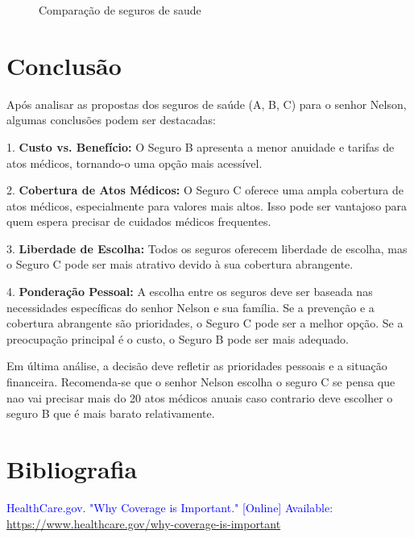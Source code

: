 \documentclass[10pt,a4paper]{article}
\begin{document}
\begin{figure}[!ht]
	\caption{Comparação de seguros de saude}
\end{figure}

\newpage
\section{Conclusão}

Após analisar as propostas dos seguros de saúde (A, B, C) para o senhor Nelson, algumas conclusões podem ser destacadas:

1. \textbf{Custo vs. Benefício:} O Seguro B apresenta a menor anuidade e tarifas de atos médicos, tornando-o uma opção mais acessível.

2. \textbf{Cobertura de Atos Médicos:} O Seguro C oferece uma ampla cobertura de atos médicos, especialmente para valores mais altos. Isso pode ser vantajoso para quem espera precisar de cuidados médicos frequentes.

3. \textbf{Liberdade de Escolha:} Todos os seguros oferecem liberdade de escolha, mas o Seguro C pode ser mais atrativo devido à sua cobertura abrangente.

4. \textbf{Ponderação Pessoal:} A escolha entre os seguros deve ser baseada nas necessidades específicas do senhor Nelson e sua família. Se a prevenção e a cobertura abrangente são prioridades, o Seguro C pode ser a melhor opção. Se a preocupação principal é o custo, o Seguro B pode ser mais adequado.

Em última análise, a decisão deve refletir as prioridades pessoais e a situação financeira. Recomenda-se que o senhor Nelson escolha o seguro C se pensa que nao vai precisar mais do 20 atos médicos anuais caso contrario deve escolher o seguro B que é mais barato relativamente.



\section{Bibliografia}
\begin{thebibliography}{9}
    \textcolor{blue}{
    HealthCare.gov. "Why Coverage is Important." [Online]
    Available: \url{https://www.healthcare.gov/why-coverage-is-important}}
\end{thebibliography}

\printindex
\end{document}
